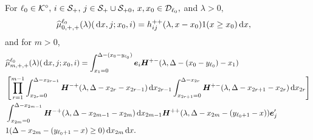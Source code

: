 \begin{lem}\label{lem: muhat }
	For \(\ell_0 \in \mathcal K^\circ,\, i\in\mathcal{S}_+,\,j\in\mathcal{S}_+\cup\mathcal{S}_{+0},\, x,x_0\in\mathcal{D}_{\ell_0},\) and \(\lambda>0,\) 
	\begin{align*}
		\widehat \mu^{\ell_0}_{0,+,+}(\lambda)( \, \mathrm{d} x,j;x_0,i) &= h_{ij}^{++}(\lambda,x-x_0)1(x\geq x_0)\, \mathrm{d} x,
	\end{align*}
	and for \(m>0\), 
	\begin{align}
		\nonumber&\widehat \mu^{\ell_0}_{m,+,+}(\lambda)( \, \mathrm{d} x,j;x_0,i) = \int_{x_1 = 0}^{\Delta-(x_0-y_{\ell_0})} \boldsymbol e_i \boldsymbol H^{+-}(\lambda,\Delta-(x_0-y_{\ell_0})-x_1)  
		\\&  \nonumber\left[\prod_{r=1}^{m-1} \int_{x_{2r}=0}^{\Delta-x_{2r-1}} \boldsymbol H^{-+}(\lambda,\Delta-x_{2r}-x_{2r-1})\, \mathrm{d} x_{2r-1}\int_{x_{2r+1}=0}^{\Delta-x_{2r}}\boldsymbol H^{+-}(\lambda,\Delta-x_{2r+1}-x_{2r})\, \mathrm{d} x_{2r}\right]
		\\& \int_{x_{2m}=0}^{\Delta-x_{2m-1}} \boldsymbol H^{-+}(\lambda,\Delta -x_{2m-1} - x_{2m}) \, \mathrm{d} x_{2m-1}\boldsymbol H^{++}(\lambda,\Delta -x_{2m}- (y_{\ell_0+1}- x))\boldsymbol e_j'{} \nonumber	
		\\& 1(\Delta-x_{2m}-(y_{\ell_0+1}-x)\geq 0)\, \mathrm{d} x_{2m} \, \mathrm{d} x.
	\end{align} 
\end{lem}
